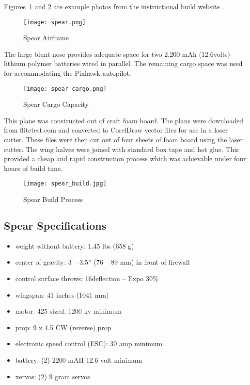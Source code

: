 Figures~\ref{fig:spear} and \ref{fig:spear_cargo} are example photos from the instructional build website \cite{flitetest}.

\begin{figure}[!h]
 \centering
  \texttt{[image: spear.png]}
  \caption{Spear Airframe \cite{flitetest}}
  \label{fig:spear}
\end{figure}

The large blunt nose provides adequate space for two 2,200 mAh (12.6volts) lithium polymer batteries wired in parallel.  The remaining cargo space was used for accommodating the Pixhawk autopilot.

\begin{figure}[!h]
 \centering
  \texttt{[image: spear\_cargo.png]}
  \caption{Spear Cargo Capacity \cite{flitetest}}
  \label{fig:spear_cargo}
\end{figure}

This plane was constructed out of craft foam board.  The plans were downloaded from flitetest.com\cite{flitetest} and converted to CorelDraw vector files for use in a laser cutter.  These files were then cut out of four sheets of foam board using the laser cutter.  The wing halves were joined with standard box tape and hot glue.  This provided a cheap and rapid construction process which was achievable under four hours of build time.

\begin{figure}[!h]
 \centering
  \texttt{[image: spear\_build.jpg]}
  \caption{Spear Build Process}
  \label{fig:spear_build}
\end{figure}

\subsection{Spear Specifications}
\begin{itemize}
 \item weight without battery: 1.45 lbs (658 g)
 \item center of gravity: 3 – 3.5” (76 – 89 mm) in front of firewall
 \item control surface throws: 16\degrees  deflection – Expo 30\%
 \item wingspan: 41 inches (1041 mm)
 \item motor: 425 sized, 1200 kv minimum
 \item prop: 9 x 4.5 CW (reverse) prop
 \item electronic speed control (ESC): 30 amp minimum
 \item battery: (2) 2200 mAH 12.6 volt minimum
 \item xervos: (2) 9 gram servos 
\end{itemize}

